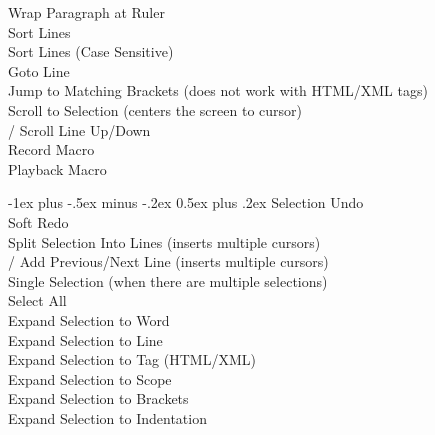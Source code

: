 \documentclass[10pt,landscape]{article}
\makeatletter
\renewcommand{\section}{\@startsection{section}{1}{0mm}%
                                {-1ex plus -.5ex minus -.2ex}%
                                {0.5ex plus .2ex}%
                                {\normalfont\large\bfseries}}
\makeatother
\begin{document}
\begin{multicols}{3}
 Wrap Paragraph at Ruler \\
 Sort Lines \\
 Sort Lines (Case Sensitive) \\
 Goto Line \\
 Jump to Matching Brackets (does not work with HTML/XML tags) \\
 Scroll to Selection (centers the screen to cursor) \\
\keys{\ctrl+\Alt+\arrowkeyup}/\keys{\arrowkeydown} Scroll Line Up/Down \\
 Record Macro \\
 Playback Macro

\section{Selection}
 Undo \\
 Soft Redo \\
 Split Selection Into Lines (inserts multiple cursors) \\
\keys{\ctrl+\shift+\arrowkeyup}/\keys{\arrowkeydown} Add Previous/Next Line (inserts multiple cursors) \\
\keys{\esc} Single Selection (when there are multiple selections) \\
 Select All \\
 Expand Selection to Word \\
 Expand Selection to Line \\
 Expand Selection to Tag (HTML/XML) \\
\keys{\cmd+\shift+\space} Expand Selection to Scope \\
 Expand Selection to Brackets \\
 Expand Selection to Indentation \\


\end{multicols}
\end{document}
